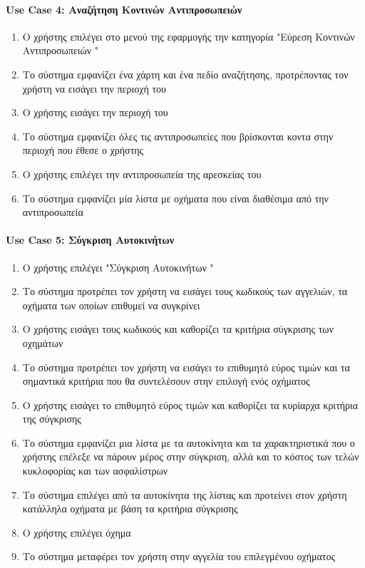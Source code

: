\documentclass{../ol-softwaremanual}
\begin{document}
	\paragraph{\en Use Case 4: \gr Αναζήτηση Κοντινών Αντιπροσωπειών}	
	
	\begin{enumerate}
		\item Ο χρήστης επιλέγει στο μενού της εφαρμογής την κατηγορία \en"\gr Εύρεση Κοντινών Αντιπροσωπειών \en"\gr
		\item Το σύστημα εμφανίζει ένα χάρτη και ένα πεδίο αναζήτησης, προτρέποντας τον χρήστη να εισάγει την περιοχή του
		\item Ο χρήστης εισάγει την περιοχή του  
		\item Το σύστημα εμφανίζει όλες τις αντιπροσωπείες που βρίσκονται κοντα στην περιοχή που έθεσε ο χρήστης
		\item Ο χρήστης επιλέγει την αντιπροσωπεία της αρεσκείας του
		\item Το σύστημα εμφανίζει μία λίστα με οχήματα που είναι διαθέσιμα από την αντιπροσωπεία     	
	\end{enumerate}
	
	
	
	\paragraph{\en Use Case 5: \gr Σύγκριση Αυτοκινήτων}
	\begin{enumerate}
		\item Ο χρήστης επιλέγει \en"\gr Σύγκριση Αυτοκινήτων \en"\gr 
		\item Το σύστημα προτρέπει τον χρήστη να εισάγει τους κωδικούς των αγγελιών, τα οχήματα των οποίων επιθυμεί να συγκρίνει
		\item Ο χρήστης εισάγει τους κωδικούς και καθορίζει τα κριτήρια σύγκρισης των οχημάτων
		\item Το σύστημα προτρέπει τον χρήστη να εισάγει το επιθυμητό εύρος τιμών και τα σημαντικά κριτήρια που θα συντελέσουν στην επιλογή ενός οχήματος
		\item Ο χρήστης εισάγει το επιθυμητό εύρος τιμών και καθορίζει τα κυρίαρχα κριτήρια της σύγκρισης
		\item Το σύστημα εμφανίζει μια λίστα με τα αυτοκίνητα και τα χαρακτηριστικά που ο χρήστης επέλεξε να πάρουν μέρος στην σύγκριση, αλλά και το κόστος των τελών κυκλοφορίας και των ασφαλίστρων
		\item Το σύστημα επιλέγει από τα αυτοκίνητα της λίστας και προτείνει στον χρήστη κατάλληλα οχήματα με βάση τα κριτήρια σύγκρισης
		\item Ο χρήστης επιλέγει όχημα 
		\item Το σύστημα μεταφέρει τον χρήστη στην αγγελία του επιλεγμένου οχήματος
	\end{enumerate}
	
\end{document}
